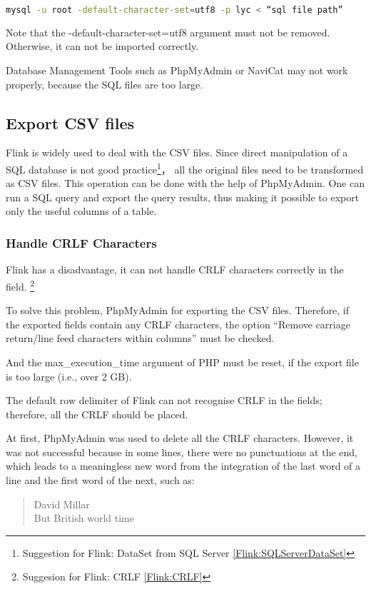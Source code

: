 \begin{lstlisting}[language=bash]
mysql -u root -default-character-set=utf8 -p lyc < “sql file path”
\end{lstlisting}

Note that the -default-character-set=utf8 argument must not be removed. Otherwise, it can not be imported correctly. 

Database Management Tools such as PhpMyAdmin or NaviCat may not work properly, because the SQL files are too large.

\subsection{Export CSV files}
Flink is widely used to deal with the CSV files. Since direct manipulation of a SQL database is not good practice\footnote{Suggestion for Flink: DataSet from SQL Server \ref{Flink:SQLServerDataSet}}， all the original files need to be transformed as CSV files. This operation can be done with the help of PhpMyAdmin. One can run a SQL query and export the query results, thus making it possible to export only the useful columns of a table.

\subsubsection{Handle CRLF Characters}
Flink has a disadvantage, it can not handle CRLF characters correctly in the field. \footnote{Suggesion for Flink: CRLF \ref{Flink:CRLF}} 

To solve this problem, PhpMyAdmin for exporting the CSV files. Therefore, if the exported fields contain any CRLF characters,  the option “Remove carriage return/line feed characters within columns” must be checked.

And the max\_execution\_time argument of PHP must be reset, if the export file is too large (i.e., over 2 GB). 

The default row delimiter of Flink can not recognise CRLF in the fields; therefore, all the CRLF should be placed. 

At first, PhpMyAdmin was used to delete all the CRLF characters. However, it was not successful because in some lines, there were no punctuations at the end, which leads to a meaningless new word from the integration of the last word of a line and the first word of the next, such as:

\begin{quote}
	David Millar\\
	But British world time
\end{quote}


